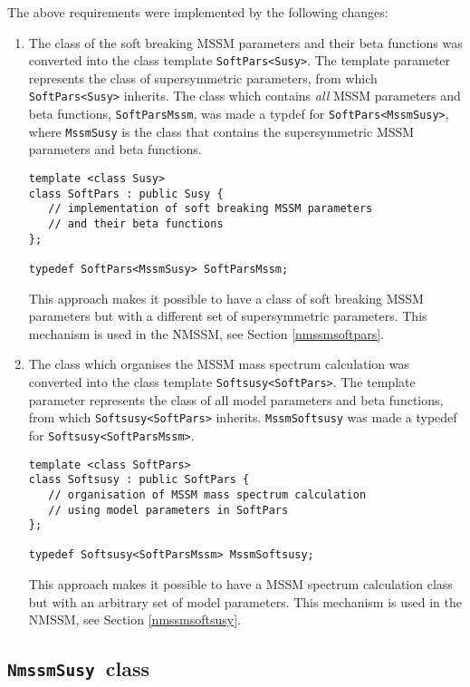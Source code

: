 \documentclass[final,3p,times,pdflatex]{elsarticle}
\def\code#1{\small{\tt #1}\normalsize}
\begin{document}
The above requirements were implemented by the following changes:
%
\begin{enumerate}
\item The class of the soft breaking MSSM parameters and their beta
  functions was converted into the class template \code{SoftPars<Susy>}.
  The template parameter represents the class of supersymmetric
  parameters, from which \code{SoftPars<Susy>} inherits.  The class
  which contains \emph{all} MSSM parameters and beta functions,
  \code{SoftParsMssm}, was made a typdef for
  \code{SoftPars<MssmSusy>}, where \code{MssmSusy} is the class that
  contains the supersymmetric MSSM parameters and beta functions.
\begin{verbatim}
template <class Susy>
class SoftPars : public Susy {
   // implementation of soft breaking MSSM parameters
   // and their beta functions
};

typedef SoftPars<MssmSusy> SoftParsMssm;
\end{verbatim}
  This approach makes it possible to have a class of soft breaking
  MSSM parameters but with a different set of supersymmetric
  parameters.  This mechanism is used in the NMSSM, see Section
  \ref{nmssmsoftpars}.

\item The class which organises the MSSM mass spectrum calculation was
  converted into the class template \code{Softsusy<SoftPars>}.  The
  template parameter represents the class of all model parameters and
  beta functions, from which \code{Softsusy<SoftPars>} inherits.
  \code{MssmSoftsusy} was made a typedef for
  \code{Softsusy<SoftParsMssm>}.
\begin{verbatim}
template <class SoftPars>
class Softsusy : public SoftPars {
   // organisation of MSSM mass spectrum calculation
   // using model parameters in SoftPars
};

typedef Softsusy<SoftParsMssm> MssmSoftsusy;
\end{verbatim}
  This approach makes it possible to have a MSSM spectrum calculation
  class but with an arbitrary set of model parameters.  This mechanism
  is used in the NMSSM, see Section \ref{nmssmsoftsusy}.
\end{enumerate}

\subsection{\code{NmssmSusy}~class}
\label{nmssmsusy}
\end{document}
